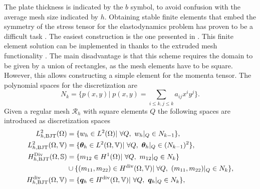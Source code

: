 The plate thickness is indicated by the $b$ symbol, to avoid confusion with the average mesh size indicated by $h$. Obtaining stable finite elements that embed the symmetry of the stress tensor for the elastodynamics problem has proven to be a difficult task \cite{arnold2002mixed}. The easiest construction is the one presented in \cite{becache2001elas}. This finite element solution can be implemented in {} \cite{rathgeber2017firedrake} thanks to the extruded mesh functionality \cite{mcrae2016}.  The main disadvantage is that this scheme requires the domain to be given by a union of rectangles, as the mesh elements have to be square. However, this allows constructing a simple element for the momenta tensor. The polynomial spaces for the discretization are
\[
N_{k} = \{p(x, y)| \; p(x, y) = \sum_{i\le k, j\le k} a_{ij} x^i y^j  \}.
\]
Given a regular mesh $\mathcal{R}_h$ with square elements $Q$ the following spaces are introduced as discretization spaces
\begin{equation}
\label{eq:BTJ}
\begin{aligned}
L_{h, \text{BJT}}^2(\Omega) &= \{w_h \in L^2(\Omega) | \ \forall Q, \ w_h|_{Q} \in N_{k-1} \}, \\
L_{h, \text{BJT}}^2(\Omega, \mathbb{V}) &= \{\bm{\theta}_h \in L^2(\Omega, \mathbb{V}) | \ \forall Q,\ \bm{\theta}_h|_{Q} \in (N_{k-1})^2 \}, \\
H_{h, \text{BJT}}^{\operatorname*{Div}}(\Omega, \mathbb{S}) &= \{m_{12} \in H^1(\Omega)| \ \forall Q,\ m_{12}|_{Q} \in N_{k} \}  \\
&\cup \{(m_{11}, m_{22}) \in H^{\operatorname{div}}(\Omega, \mathbb{V})| \; \forall Q,\ (m_{11}, m_{22})|_{Q} \in N_{k} \}, \\
H_{h, \text{BJT}}^{\operatorname{div}}(\Omega, \mathbb{V}) &= \{\bm{q}_h \in H^{\operatorname{div}}(\Omega, \mathbb{V}) | \ \forall Q,\ \bm{q}_h|_{Q} \in N_{k} \}, \\ 
\end{aligned}
\end{equation}

